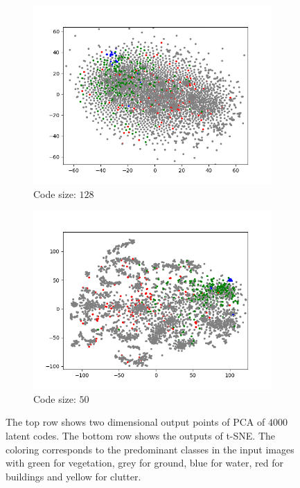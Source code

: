 \begin{figure}[H]
\begin{subfigure}{.25\textwidth}
        \includegraphics[width=\textwidth]{images/figures/experiments_latent/pooling_dim1024_classes.png}   
        \caption{Code size: $128$}
    \end{subfigure}%
    \begin{subfigure}{.25\textwidth}
        \centering
        \includegraphics[width=\textwidth]{images/figures/experiments_latent/pooling_dim50_classes.png}
        \caption{Code size: $50$}
    \end{subfigure}
    \caption{The top row shows two dimensional output points of PCA of $4000$ latent codes. 
    The bottom row shows the outputs
    of t-SNE. The coloring corresponds to the predominant classes in the input images with green for vegetation, 
    grey for ground, blue for water, red for buildings and yellow for clutter.}
\end{figure}

